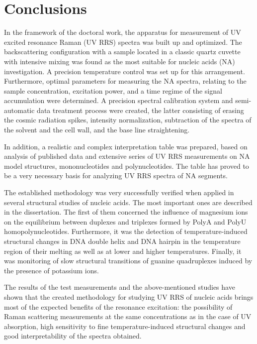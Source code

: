 \chapter*{Conclusions}

In the framework of the doctoral work, the apparatus for measurement of UV
excited resonance Raman (UV RRS) spectra was built up and optimized.
The backscattering configuration with a sample located in a classic quartz
cuvette with intensive mixing was found as the most suitable for nucleic acids
(NA) investigation.
A precision temperature control was set up for this arrangement.
Furthermore, optimal parameters for measuring the NA spectra, relating to the
sample concentration, excitation power, and a time regime of the signal
accumulation were determined.
A precision spectral calibration system and semi-automatic data treatment
process were created, the latter consisting of erasing the cosmic radiation
spikes, intensity normalization, subtraction of the spectra of the solvent and
the cell wall, and the base line straightening.

In addition, a realistic and complex interpretation table was prepared, based
on analysis of published data and extensive series of UV RRS measurements on NA
model structures, mononucleotides and polynucleotides.
The table has proved to be a very necessary basis for analyzing UV RRS spectra
of NA segments.

The established methodology was very successfully verified when applied in
several structural studies of nucleic acids.
The most important ones are described in the dissertation.
The first of them concerned the influence of magnesium ions on the equilibrium
between duplexes and triplexes formed by PolyA and PolyU homopolynucleotides.
Furthermore, it was the detection of temperature-induced structural changes in
DNA double helix and DNA hairpin in the temperature region of their melting as
well as at lower and higher temperatures.
Finally, it was monitoring of slow structural transitions of guanine
quadruplexes induced by the presence of potassium ions.

The results of the test measurements and the above-mentioned studies have shown
that the created methodology for studying UV RRS of nucleic acids brings most
of the expected benefits of the resonance excitation: the possibility of Raman
scattering measurements at the same concentrations as in the case of UV
absorption, high sensitivity to fine temperature-induced structural changes and
good interpretability of the spectra obtained.

